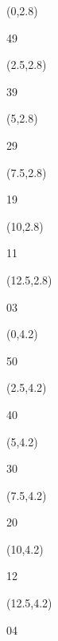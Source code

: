 \documentclass[a4paper]{article}
\newcommand{\myseat}[4]{%
	\vspace{0.1cm}
	\parbox[t][2.5cm][t]{3.5cm}{
	\small #1 %
	\begin{description}
	\vspace{-0.1cm}
	\item [ID:] #2
	\vspace{-0.1cm}
	\item [Team:] #3 \normalsize
	\vspace{-0.1cm}
	\item \normalsize #4
	\vspace{-0.1cm}
	\end{description}
	}
}
\begin{document}
\begin{textblock}{2.5}(0,2.8)
\textblockcolor{}
	\myseat{49}{}{}{}
\end{textblock}

\begin{textblock}{2.5}(2.5,2.8)
\textblockcolor{}
	\myseat{39}{}{}{}
\end{textblock}

\begin{textblock}{2.5}(5,2.8)
\textblockcolor{}
	\myseat{29}{}{}{}
\end{textblock}

\begin{textblock}{2.5}(7.5,2.8)
\textblockcolor{}
	\myseat{19}{}{}{}
\end{textblock}

\begin{textblock}{2.5}(10,2.8)
\textblockcolor{}
	\myseat{11}{}{}{}
\end{textblock}

\begin{textblock}{2.5}(12.5,2.8)
\textblockcolor{}
	\myseat{03}{}{}{}
\end{textblock}

\begin{textblock}{2.5}(0,4.2)
\textblockcolor{}
	\myseat{50}{}{}{}
\end{textblock}

\begin{textblock}{2.5}(2.5,4.2)
\textblockcolor{}
	\myseat{40}{}{}{}
\end{textblock}

\begin{textblock}{2.5}(5,4.2)
\textblockcolor{}
	\myseat{30}{}{}{}
\end{textblock}

\begin{textblock}{2.5}(7.5,4.2)
\textblockcolor{}
	\myseat{20}{}{}{}
\end{textblock}

\begin{textblock}{2.5}(10,4.2)
\textblockcolor{}
	\myseat{12}{}{}{}
\end{textblock}

\begin{textblock}{2.5}(12.5,4.2)
\textblockcolor{}
	\myseat{04}{}{}{}
\end{textblock}
\end{document}
